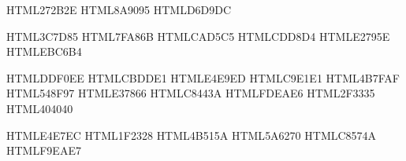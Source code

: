 %
%

\definecolor{fgInk}  {HTML}{272B2E}   %
\definecolor{fgMute} {HTML}{8A9095}   %
\definecolor{fgRule} {HTML}{D6D9DC}   %

\definecolor{fgTeal} {HTML}{3C7D85}   %
\definecolor{fgGrn}  {HTML}{7FA86B}   %
\definecolor{fgGrnL} {HTML}{CAD5C5}
\definecolor{fgSage} {HTML}{CDD8D4}
\definecolor{fgCor}  {HTML}{E2795E}   %
\definecolor{fgCorL} {HTML}{EBC6B4}

\definecolor{fMint}  {HTML}{DDF0EE}   %
\definecolor{fRicO}  {HTML}{CBDDE1}   %
\definecolor{fRicI}  {HTML}{E4E9ED}   %
\definecolor{fXapp}  {HTML}{C9E1E1}   %
\definecolor{fBlue}  {HTML}{4B7FAF}   %
\definecolor{fTeal}  {HTML}{548F97}   %
\definecolor{fCor}   {HTML}{E37866}   %
\definecolor{fRed}   {HTML}{C8443A}   %
\definecolor{fPink}  {HTML}{FDEAE6}   %
\definecolor{fInk}   {HTML}{2F3335}   %
\definecolor{fBadge} {HTML}{404040}   %

\definecolor{gPanel} {HTML}{E4E7EC}   %
\definecolor{gInk}   {HTML}{1F2328}   %
\definecolor{gHead}  {HTML}{4B515A}   %
\definecolor{gLine}  {HTML}{5A6270}   %
\definecolor{gRed}   {HTML}{C8574A}   %
\definecolor{gPink}  {HTML}{F9EAE7}   %

